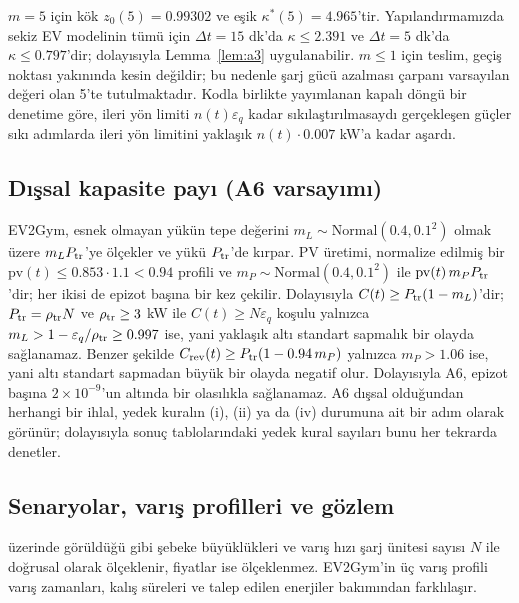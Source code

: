 $m=5$ için kök $z_0(5)=0.99302$ ve eşik $\kappa^{*}(5)=4.965$'tir.
Yapılandırmamızda sekiz EV modelinin tümü için $\Delta t=15$ dk'da $\kappa\le2.391$ ve $\Delta t=5$ dk'da $\kappa\le0.797$'dir; dolayısıyla Lemma~\ref{lem:a3} uygulanabilir.
$m\le1$ için teslim, geçiş noktası yakınında kesin değildir; bu nedenle şarj gücü azalması çarpanı varsayılan değeri olan 5'te tutulmaktadır.
Kodla birlikte yayımlanan kapalı döngü bir denetime göre, ileri yön limiti $n(t)\varepsilon_q$ kadar sıkılaştırılmasaydı gerçekleşen güçler sıkı adımlarda ileri yön limitini yaklaşık $n(t)\cdot0.007$ kW'a kadar aşardı.

\subsection{Dışsal kapasite payı (A6 varsayımı)}\label{app:a6}

EV2Gym, esnek olmayan yükün tepe değerini $m_L\sim\mathrm{Normal}(0.4,0.1^2)$ olmak üzere $m_LP_{\mathrm{tr}}$'ye ölçekler ve yükü $P_{\mathrm{tr}}$'de kırpar.
PV üretimi, normalize edilmiş bir $\mathrm{pv}(t)\le0.853\cdot1.1<0.94$ profili ve $m_P\sim\mathrm{Normal}(0.4,0.1^2)$ ile $\mathrm{pv}(t)\,m_PP_{\mathrm{tr}}$'dir; her ikisi de epizot başına bir kez çekilir.
Dolayısıyla $C(t)\ge P_{\mathrm{tr}}(1-m_L)$'dir; $P_{\mathrm{tr}}=\rho_{\mathrm{tr}}N$ ve $\rho_{\mathrm{tr}}\ge3$ kW ile $C(t)\ge N\varepsilon_q$ koşulu yalnızca $m_L>1-\varepsilon_q/\rho_{\mathrm{tr}}\ge0.997$ ise, yani yaklaşık altı standart sapmalık bir olayda sağlanamaz.
Benzer şekilde $C_{\mathrm{rev}}(t)\ge P_{\mathrm{tr}}(1-0.94\,m_P)$ yalnızca $m_P>1.06$ ise, yani altı standart sapmadan büyük bir olayda negatif olur.
Dolayısıyla A6, epizot başına $2\times10^{-9}$'un altında bir olasılıkla sağlanamaz.
A6 dışsal olduğundan herhangi bir ihlal, yedek kuralın (i), (ii) ya da (iv) durumuna ait bir adım olarak görünür; dolayısıyla sonuç tablolarındaki yedek kural sayıları bunu her tekrarda denetler.

\subsection{Senaryolar, varış profilleri ve gözlem}\label{app:scenarios}

 üzerinde görüldüğü gibi şebeke büyüklükleri ve varış hızı şarj ünitesi sayısı $N$ ile doğrusal olarak ölçeklenir, fiyatlar ise ölçeklenmez.
EV2Gym'in üç varış profili varış zamanları, kalış süreleri ve talep edilen enerjiler bakımından farklılaşır.

